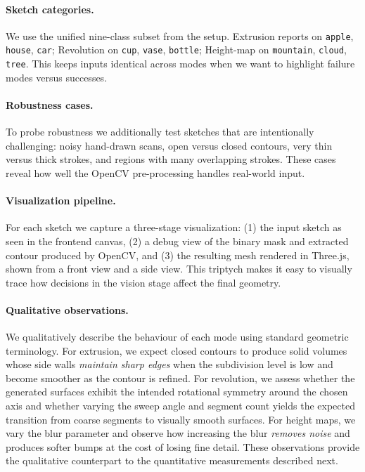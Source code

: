 \documentclass[11pt, a4paper]{article}
\begin{document}
\paragraph{Sketch categories.} We use the unified nine-class subset from the setup. Extrusion reports on \texttt{apple}, \texttt{house}, \texttt{car}; Revolution on \texttt{cup}, \texttt{vase}, \texttt{bottle}; Height-map on \texttt{mountain}, \texttt{cloud}, \texttt{tree}. This keeps inputs identical across modes when we want to highlight failure modes versus successes.

\paragraph{Robustness cases.} To probe robustness we additionally test sketches that are intentionally challenging: noisy hand-drawn scans, open versus closed contours, very thin versus thick strokes, and regions with many overlapping strokes. These cases reveal how well the OpenCV pre-processing handles real-world input.

\paragraph{Visualization pipeline.} For each sketch we capture a three-stage visualization: (1) the input sketch as seen in the frontend canvas, (2) a debug view of the binary mask and extracted contour produced by OpenCV, and (3) the resulting mesh rendered in Three.js, shown from a front view and a side view. This triptych makes it easy to visually trace how decisions in the vision stage affect the final geometry.

\paragraph{Qualitative observations.} We qualitatively describe the behaviour of each mode using standard geometric terminology. For extrusion, we expect closed contours to produce solid volumes whose side walls \emph{maintain sharp edges} when the subdivision level is low and become smoother as the contour is refined. For revolution, we assess whether the generated surfaces exhibit the intended rotational symmetry around the chosen axis and whether varying the sweep angle and segment count yields the expected transition from coarse segments to visually smooth surfaces. For height maps, we vary the blur parameter and observe how increasing the blur \emph{removes noise} and produces softer bumps at the cost of losing fine detail. These observations provide the qualitative counterpart to the quantitative measurements described next.
\end{document}
